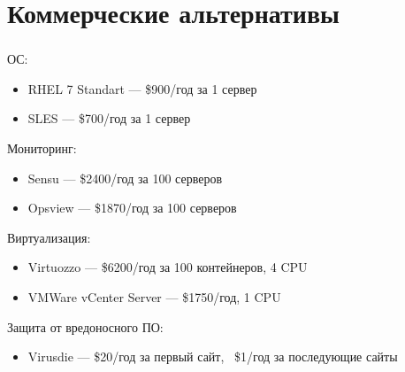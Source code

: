 
\section{Коммерческие альтернативы}

\begin{frame}
\frametitle{\insertsection}
ОС:
\begin{itemize}
	\item RHEL 7 Standart --- \$900/год за 1 сервер
	\item SLES --- \$700/год за 1 сервер
\end{itemize}
Мониторинг:
\begin{itemize}
	\item Sensu --- \$2400/год за 100 серверов
	\item Opsview --- \$1870/год за 100 серверов
\end{itemize}
Виртуализация:
\begin{itemize}
	\item Virtuozzo --- \$6200/год за 100 контейнеров, 4 CPU
	\item VMWare vCenter Server --- \$1750/год, 1 CPU
\end{itemize}
Защита от вредоносного ПО:
\begin{itemize}
	\item Virusdie --- \$20/год за первый сайт, ~\$1/год за последующие сайты
\end{itemize}
\end{frame}


\frame[plain]{\titlepage} %
